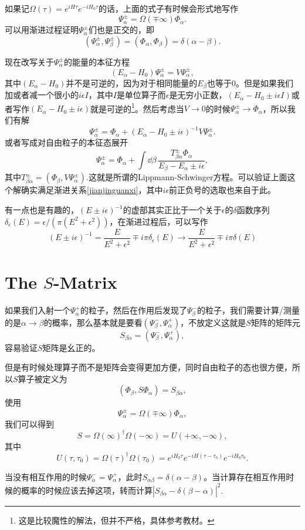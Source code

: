 \documentclass[9pt]{extbook}
\begin{document}
如果记$\Omega(\tau)=e^{iH\tau}e^{-iH_0\tau}$的话，上面的式子有时候会形式地写作
\[
\Psi_\alpha^\pm=\Omega(\mp \infty)\Phi_\alpha.
\]
可以用渐进过程证明$\Psi_\alpha^\pm$们也是正交的，即
\[
(\Psi_\alpha^\pm,\Psi_\beta^\pm)=(\Phi_\alpha,\Phi_\beta)=\delta(\alpha-\beta).
\]

现在改写关于$\Psi_\alpha^\pm$的能量的本征方程
\[
(E_\alpha-H_0)\Psi_\alpha^\pm=V\Psi_\alpha^\pm,
\]
其中$(E_\alpha-H_0)$并不是可逆的，因为对于相同能量的$E_\beta$也等于0。但是如果我们加或者减一个很小的$i\epsilon I$，其中$I$是单位算子而$\epsilon$是无穷小正数，$(E_\alpha-H_0\pm i\epsilon I)$或者写作$(E_\alpha-H_0\pm i\epsilon)$就是可逆的\footnote{这是比较魔性的解法，但并不严格，具体参考教材。}。然后考虑当$V\to 0$的时候$\Psi_\alpha^\pm \to \Phi_\alpha$，所以我们有解
\[
\Psi_\alpha^\pm=\Phi_\alpha+(E_\alpha-H_0\pm i\epsilon)^{-1}V\Psi_\alpha^\pm.
\]
或者写成对自由粒子的本征态展开
\[
\Psi_\alpha^\pm=\Phi_\alpha+\int \dd \beta \,\frac{T^\pm_{\beta\alpha}\Phi_\alpha}{E_\beta-E_\alpha\pm i\epsilon},
\]
其中$T^\pm_{\beta\alpha}=(\Phi_\beta,V\Psi_\alpha^\pm)$.这就是所谓的Lippmann-Schwinger方程。可以验证上面这个解确实满足渐进关系\eqref{jianjinguanxi}，其中$i\epsilon$前正负号的选取也来自于此。

有一点也是有趣的，$(E\pm i\epsilon)^{-1}$的虚部其实正比于一个关于$\epsilon$的$\delta$函数序列$\delta_{\epsilon}(E)=\epsilon/(\pi(E^2+\epsilon^2))$，在渐进过程后，可以写作
\[
(E\pm i\epsilon)^{-1}=\frac{E}{E^2+\epsilon^2}\mp i \pi \delta_{\epsilon}(E)\to \frac{E}{E^2+\epsilon^2}\mp i \pi \delta(E)
\]

\section{The $S$-Matrix}
如果我们入射一个$\Psi_\alpha^+$的粒子，然后在作用后发现了$\Psi_\beta^-$的粒子，我们需要计算/测量的是$\alpha \to \beta$的概率，那么基本就是要看$(\Psi_\beta^-,\Psi_\alpha^+)$，不放定义这就是$S$矩阵的矩阵元
\[
	S_{\beta\alpha}=\left(\Psi_\beta^-,\Psi_\alpha^+\right),
\]
容易验证$S$矩阵是幺正的。

但是有时候处理算子而不是矩阵会变得更加方便，同时自由粒子的态也很方便，所以$S$算子被定义为
\[(\Phi_\beta,S\Phi_\alpha)=S_{\beta\alpha},
\]
使用\[
\Psi_\alpha^\pm=\Omega(\mp \infty)\Phi_\alpha,
\]我们可以得到
\[S=\Omega(\infty)^\dag \Omega(-\infty)=U(+\infty,-\infty),
\]
其中\[U(\tau,\tau_0)=\Omega(\tau)^\dag \Omega(\tau_0)=e^{iH_0\tau}e^{-iH(\tau-\tau_0)}e^{-iH_0\tau_0}.\]

当没有相互作用的时候$\Psi_\alpha^-=\Psi_\alpha^+$，此时$S_{\alpha\beta}=\delta(\alpha-\beta)$。当计算存在相互作用时候的概率的时候应该去掉这项，转而计算$|S_{\beta\alpha}-\delta(\beta-\alpha)|^2$.
\end{document}
